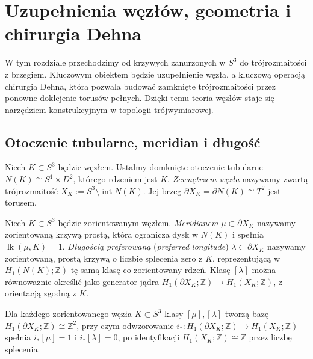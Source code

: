 \chapter{Uzupełnienia węzłów, geometria i chirurgia Dehna}
\label{ch:kt-chirurgia-3d}

W tym rozdziale przechodzimy od krzywych zanurzonych w $S^3$ do
trójrozmaitości z brzegiem. Kluczowym obiektem będzie uzupełnienie
węzła, a kluczową operacją chirurgia Dehna, która pozwala budować
zamknięte trójrozmaitości przez ponowne doklejenie torusów pełnych.
Dzięki temu teoria węzłów staje się narzędziem konstrukcyjnym
w topologii trójwymiarowej.

\section{Otoczenie tubularne, meridian i długość}
\label{sec:kt-peryferia}

\begin{definicja}
Niech $K\subset S^3$ będzie węzłem. Ustalmy domknięte otoczenie
tubularne $N(K)\cong S^1\times D^2$, którego rdzeniem jest $K$.
\emph{Zewnętrzem węzła} nazywamy zwartą trójrozmaitość
$X_K:=S^3\setminus\operatorname{int}N(K)$. Jej brzeg
$\partial X_K=\partial N(K)\cong T^2$ jest torusem.
\end{definicja}

\begin{definicja}
Niech $K\subset S^3$ będzie zorientowanym węzłem.
\emph{Meridianem} $\mu\subset\partial X_K$ nazywamy
zorientowaną krzywą prostą, która ogranicza dysk
w $N(K)$ i spełnia $\operatorname{lk}(\mu,K)=1$.
\emph{Długością preferowaną} (\emph{preferred longitude})
$\lambda\subset\partial X_K$ nazywamy zorientowaną,
prostą krzywą o liczbie splecenia zero z $K$, reprezentującą
w $H_1(N(K);\mathbb Z)$ tę samą klasę co zorientowany rdzeń.
Klasę $[\lambda]$ można równoważnie określić jako generator
jądra $H_1(\partial X_K;\mathbb Z)\to H_1(X_K;\mathbb Z)$,
z orientacją zgodną z $K$.
\end{definicja}

\begin{stwierdzenie}
Dla każdego zorientowanego węzła $K\subset S^3$ klasy
$[\mu],[\lambda]$ tworzą bazę $H_1(\partial X_K;\mathbb Z)
\cong\mathbb Z^2$, przy czym odwzorowanie
$i_*\colon H_1(\partial X_K;\mathbb Z)\to H_1(X_K;\mathbb Z)$
spełnia $i_*[\mu]=1$ i $i_*[\lambda]=0$, po identyfikacji
$H_1(X_K;\mathbb Z)\cong\mathbb Z$ przez liczbę splecenia.
\end{stwierdzenie}

